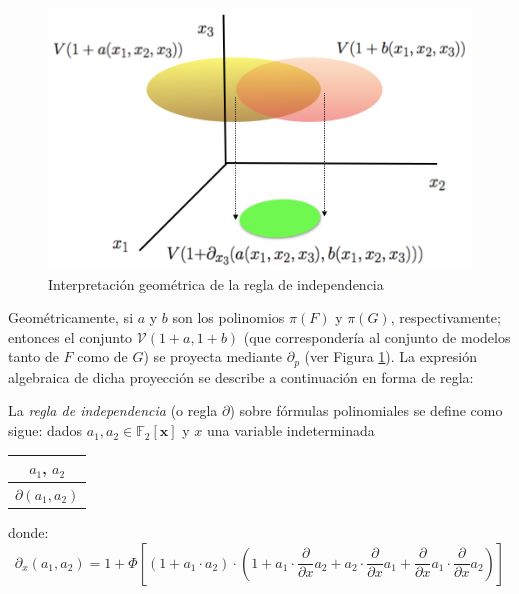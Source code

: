 \vspace{0.5cm}
\begin{figure}[h]
	\centering
		\includegraphics[scale=0.65]{imagenes/indegeo.png}
	\caption{Interpretación geométrica de la regla de independencia}
	\label{fig:proy2}
\end{figure}
\vspace{0.5cm}

Geométricamente, si $a$ y $b$ son los polinomios $\pi (F)$ y $\pi (G)$, respectivamente; entonces el conjunto $\mathcal{V} (1+a,1+b)$ (que correspondería al conjunto de modelos tanto de $F$ como de $G$) se proyecta mediante $\partial_p$ (ver Figura \ref{fig:proy2}). La expresión algebraica de dicha proyección se describe a continuación en forma de regla:

 La \textit{regla de independencia} (o regla $\partial$) sobre fórmulas polinomiales se define como sigue: dados $a_1,a_2 \in \mathbb{F}_2 [\textbf{x}]$ y $x$ una variable indeterminada

\begin{table}[h]
\centering
\begin{tabular}{c}
$a_1$, $a_2$ \\
\hline $\partial (a_1,a_2)$
\end{tabular}
\end{table}


\noindent donde:
$$\partial_x (a_1, a_2) = 1 + \Phi [(1+a_1 \cdot a_2) \cdot (1+a_1 \cdot \frac{\partial}{\partial x} a_2 + a_2 \cdot \frac{\partial}{\partial x} a_1 + \frac{\partial}{\partial x} a_1 \cdot \frac{\partial}{\partial x} a_2)]$$

